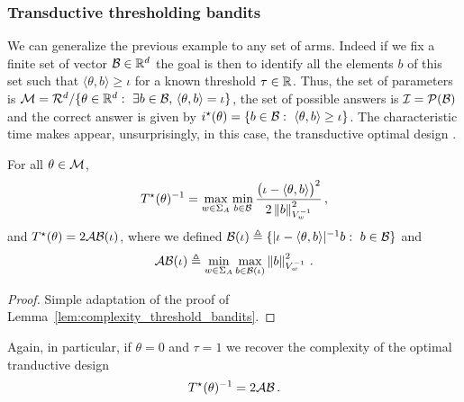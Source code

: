 \subsubsection{Transductive thresholding bandits}
\label{app:transductive_threshold_bandits}
We can generalize the previous example to any set of arms. Indeed if we fix a finite set of vector $\mathcal{B}\in\mathbb{R}^d$ the goal is then to identify all the elements $b$ of this set such that $\langle \theta, b \rangle \geq \iota$ for a known threshold $\tau \in \mathbb{R}$. Thus, the set of parameters is $\mathcal{M}=\mathcal{R}^d/\{\theta\in\mathbb{R}^d:\ \exists b\in \mathcal{B},\, \langle \theta,b\rangle = \iota\}$, the set of possible answers is $\mathcal{I} = \mathcal{P}(\mathcal{B})$ and the correct answer is given by
$\istar(\theta)=\{b\in\cB:\ \langle \theta,b\rangle \geq \iota\}$. The characteristic time makes appear, unsurprisingly, in this case, the transductive optimal design \citep{yu2006active}.
\begin{lemma} For all $\theta \in\mathcal{M}$,
  \label{lem:complexity_transductive_threshold_bandits}
  \[
  T^{\star}(\theta)^{-1} =  \max_{w\in\Sigma_A} \min_{b\in\mathcal{B}} \frac{\big(\iota -\langle \theta,b\rangle\big)^2}{2 \left\lVert b\right\rVert_{V_w^{-1}}^2}\,,
  \]
  and $T^{\star}(\theta)= 2\mathcal{A}\mathcal{B}(\iota)$, where we defined $\mathcal{B}(\iota)\triangleq \{ |\iota- \langle\theta,b\rangle|^{-1} b:\ b\in\mathcal{B}\}$ and
  \[
  \mathcal{A}\mathcal{B}(\iota) \triangleq  \min_{w\in\Sigma_A} \max_{b\in\mathcal{B}(\iota)}\left\lVert b\right\rVert_{V_w^{-1}}^2\,.
  \]
\end{lemma}
\begin{proof}
  Simple adaptation of the proof of Lemma~\ref{lem:complexity_threshold_bandits}.
\end{proof}
Again, in particular, if $\theta=0$ and $\tau=1$ we recover the complexity of the optimal tranductive design
\[
T^{\star}(\theta)^{-1} = 2 \mathcal{A}\mathcal{B}\,.
\]
